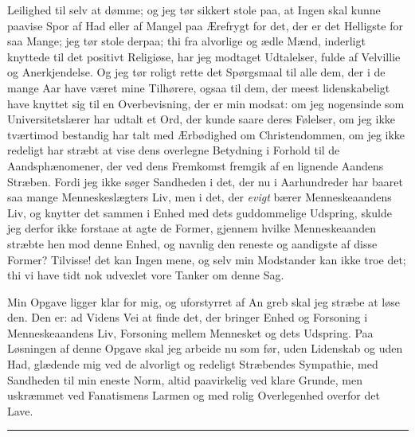 \documentclass[12pt,a4paper]{book}
\newcommand{\opage}[1]{\marginnote{\footnotesize\textit{[#1]}}}
\begin{document}
Leilighed til selv at dømme; og jeg tør sikkert stole paa, at Ingen skal kunne
paavise Spor af Had eller af Mangel paa Ærefrygt for det, der er det Helligste
for saa Mange; jeg tør stole derpaa; thi fra alvorlige og ædle Mænd, inderligt
knyttede til det positivt Religiøse, har jeg modtaget Udtalelser, fulde af
Velvillie og Anerkjendelse. Og jeg tør roligt rette det Spørgsmaal til alle dem,
der i de mange Aar have været mine Tilhørere, ogsaa til dem, der meest
lidenskabeligt have knyttet sig til en Overbevisning, der er min modsat: om jeg
nogensinde som Universitetslærer har udtalt et Ord, der kunde saare deres
Følelser, om jeg ikke tværtimod bestandig har talt med Ærbødighed om
Christendommen, om jeg ikke redeligt har stræbt at vise dens overlegne Betydning
i Forhold til de Aandsphænomener, der ved dens Fremkomst fremgik af en lignende
Aandens Stræben. Fordi jeg ikke søger Sandheden i det, der nu i Aarhundreder har
baaret saa mange Menneskeslægters Liv, men i det, der \emph{evigt} bærer
Menneskeaandens Liv, og knytter det sammen i Enhed med dets guddommelige
Udspring, skulde jeg derfor ikke forstaae at agte de Former, gjennem hvilke
Menneskeaanden stræbte hen mod denne Enhed, og navnlig den reneste og aandigste
af disse Former? Tilvisse! det kan Ingen mene, og selv min Modstander kan ikke
troe det; thi vi have tidt nok udvexlet vore Tanker om denne Sag.

Min Opgave ligger klar for mig, og uforstyrret af An\-%
\opage{31}%
greb skal jeg stræbe at løse den. Den er: ad Videns Vei at finde det, der
bringer Enhed og Forsoning i Menneskeaandens Liv, Forsoning mellem Mennesket og
dets Udspring. Paa Løsningen af denne Opgave skal jeg arbeide nu som før, uden
Lidenskab og uden Had, glædende mig ved de alvorligt og redeligt Stræbendes
Sympathie, med Sandheden til min eneste Norm, altid paavirkelig ved klare
Grunde, men uskræmmet ved Fanatismens Larmen og med rolig Overlegenhed overfor
det Lave.

\begin{center}\rule{2cm}{0.4pt}\end{center}
\end{document}
